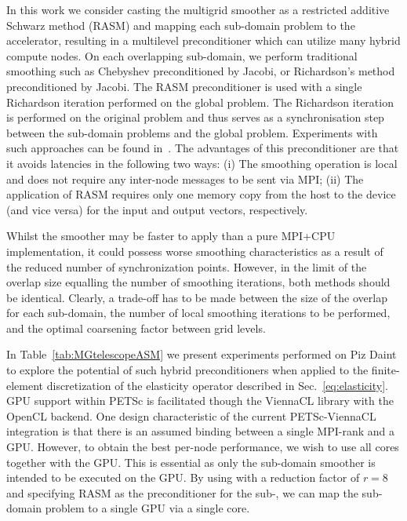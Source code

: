\documentclass[]{siamart0216}
\begin{document}
In this work we consider casting the multigrid smoother as a restricted additive Schwarz method (RASM) and mapping each sub-domain problem to the accelerator,
resulting in a multilevel preconditioner which can utilize many hybrid compute nodes. 
On each overlapping sub-domain, we perform traditional smoothing such as Chebyshev preconditioned by Jacobi, or Richardson's method  preconditioned by Jacobi.
The RASM preconditioner is used with a single Richardson iteration performed on the global problem. 
The Richardson iteration is performed on the original problem and thus serves as a synchronisation step between the 
sub-domain problems and the global problem. Experiments with such approaches can be found in~\cite{luo2011scalable}.
The  advantages of this preconditioner are that it avoids latencies in the following two ways: 
(i) The smoothing operation is local and does not require any inter-node messages to be sent via MPI; 
(ii) The application of RASM requires only one memory copy from the host to the device (and vice versa) for the input and output 
vectors, respectively.


Whilst the smoother may be faster to apply than a pure MPI+CPU implementation, it could possess worse 
smoothing characteristics as a result of the reduced number of synchronization points. 
However, in the limit of the overlap size equalling the number of smoothing iterations, both methods should be identical.
Clearly, a trade-off has to be made between the size of the overlap for each sub-domain, the number of local smoothing 
iterations to be performed, and the optimal coarsening factor between grid levels.

In Table~\ref{tab:MGtelescopeASM} we present experiments performed on Piz Daint 
to explore the potential of such hybrid preconditioners when 
applied to the finite-element discretization of the elasticity operator described in Sec.~\ref{eq:elasticity}. 
GPU support within PETSc is facilitated though the ViennaCL library \cite{Rupp:ViennaCL} with the OpenCL backend.
One design characteristic of the current PETSc-ViennaCL integration is that there is an assumed 
binding between a single MPI-rank and a GPU. However, to obtain the best per-node performance, we 
wish to use all cores together with the GPU. This is essential as only the sub-domain smoother is intended to be executed on the GPU. 
By using  with a reduction factor of $r = 8$ and specifying RASM as the preconditioner for the sub-, 
we can map the sub-domain problem to a single GPU via a single core.
\end{document}
